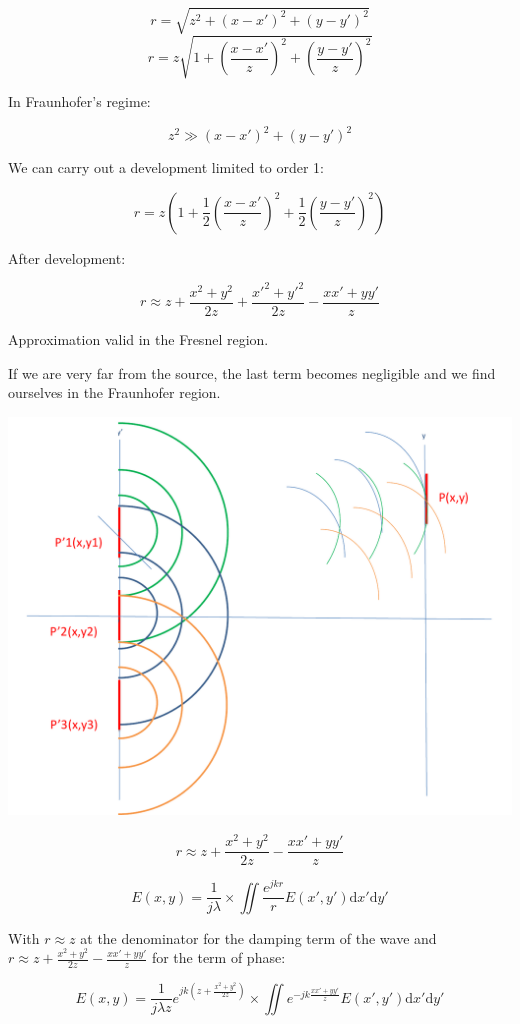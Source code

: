 \documentclass[10pt,a4paper]{article}
\begin{document}
\[r=\sqrt{z^2+(x-x')^2+(y-y')^2}\]
\[r=z\sqrt{1+\left(\frac{x-x'}{z}\right)^2+\left(\frac{y-y'}{z}\right)^2}\]

In Fraunhofer’s regime:

\[z^2\gg(x-x')^2+(y-y')^2\]

We can carry out a development limited to order 1: 

\[r=z\left(1+\frac{1}{2}\left(\frac{x-x'}{z}\right)^2+\frac{1}{2}\left(\frac{y-y'}{z}\right)^2\right)\]

After development:

\[r \approx z+\frac{x^2+y^2}{2z}+\frac{x'^2+y'^2}{2z}-\frac{xx'+yy'}{z}\]

Approximation valid in the Fresnel region. 

If we are very far from the source, the last term becomes negligible and we find ourselves in the Fraunhofer region.

\begin{center}
\includegraphics[scale=0.32]{../Ressources/schema-3-crop.png}
\end{center}

\[r \approx z+\frac{x^2+y^2}{2z}-\frac{xx'+yy'}{z}\]

\[
E(x,y)=\frac{1}{j\lambda} 
\times \iint \frac{e^{jkr}}{r}
E(x',y')\mathrm{d}x'\mathrm{d}y'
\]

With $r\approx z$ at the denominator for the damping term of the wave and $r \approx z+\frac{x^2+y^2}{2z}-\frac{xx'+yy'}{z}$ for the term of phase:

\[
E(x,y)=\frac{1}{j\lambda z} e^{jk\left(z+\frac{x^2+y^2}{2z}\right)}
\times \iint e^{-jk\frac{xx'+yy'}{z}}
E(x',y')\mathrm{d}x'\mathrm{d}y'
\]
\end{document}

